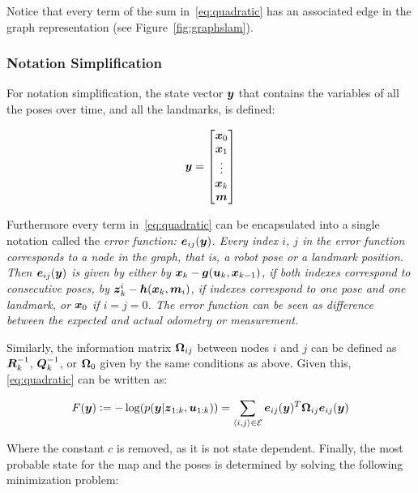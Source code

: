 Notice that every term of the sum in~\eqref{eq:quadratic} has an associated edge in the graph representation (see Figure~\ref{fig:graphslam}). 

\subsubsection{Notation Simplification}

For notation simplification, the state vector $\boldsymbol{y}$ that contains the variables of all the poses over time, and all the landmarks, is defined:

\begin{equation}
\boldsymbol{y} = \begin{bmatrix}
\boldsymbol{x}_0\\
\boldsymbol{x}_1\\
\vdots\\
\boldsymbol{x}_k\\
\boldsymbol{m}
\end{bmatrix}
\end{equation}

Furthermore every term in~\eqref{eq:quadratic} can be encapsulated into a single notation called the \it{error function}: $\boldsymbol{e}_{ij}(\boldsymbol{y})$. Every index $i$, $j$ in the error function corresponds to a node in the graph, that is, a robot pose or a landmark position. Then $\boldsymbol{e}_{ij}(\boldsymbol{y})$ is given by either by $\boldsymbol{x}_k-\boldsymbol{g}(\boldsymbol{u}_k,\boldsymbol{x}_{k-1})$, if both indexes correspond to consecutive poses, by $\boldsymbol{z}_k^i-\boldsymbol{h}(\boldsymbol{x}_k,\boldsymbol{m}_i)$, if indexes correspond to one pose and one landmark, or $\boldsymbol{x}_0$ if $i=j=0$. The error function can be seen as difference between the expected and actual odometry or measurement. 

Similarly, the information matrix $\boldsymbol{\Omega}_{ij}$ between nodes $i$ and $j$ can be defined as $\boldsymbol{R}_k^{-1}$, $\boldsymbol{Q}_k^{-1}$, or $\boldsymbol{\Omega}_0$ given by the same conditions as above. Given this,\eqref{eq:quadratic} can be written as:

\begin{equation}
F(\boldsymbol{y}) \vcentcolon= -\log(p(\boldsymbol{y}|\boldsymbol{z}_{1:k},\boldsymbol{u}_{1:k})) = \sum_{\left<i,j\right>\in\mathcal{E}}\boldsymbol{e}_{ij}(\boldsymbol{y})^T\boldsymbol{\Omega}_{ij} \boldsymbol{e}_{ij}(\boldsymbol{y}) 
\label{eq:simplified}
\end{equation}

\noindent
Where the constant $c$ is removed, as it is not state dependent. Finally, the most probable state for the map and the poses is determined by solving the following minimization problem: 

